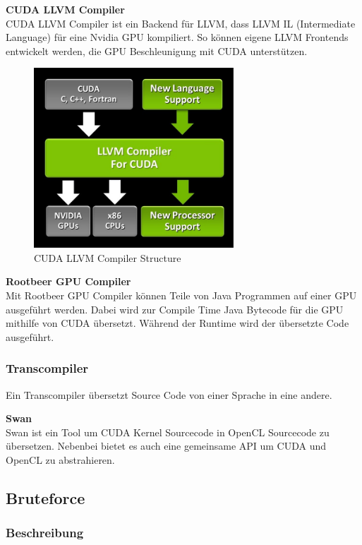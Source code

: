 \newpage

\textbf{CUDA LLVM Compiler}\\
CUDA LLVM Compiler ist ein Backend für LLVM, dass LLVM IL (Intermediate Language) für eine Nvidia GPU kompiliert. So können eigene LLVM Frontends entwickelt werden, die GPU Beschleunigung mit CUDA unterstützen.

\begin{figure}[!h]
	\begin{center}
		\includegraphics[width=7.5cm]{images/LLVM_Compiler_structure.jpg}
		\caption{CUDA LLVM Compiler Structure\cite{cudallvm}}
	\end{center}
\end{figure}

\textbf{Rootbeer GPU Compiler}\\
Mit Rootbeer GPU Compiler können Teile von Java Programmen auf einer GPU ausgeführt werden. Dabei wird zur Compile Time Java Bytecode für die GPU mithilfe von CUDA übersetzt. Während der Runtime wird der übersetzte Code ausgeführt.\cite{rootbeer1}

\subsubsection{Transcompiler}
Ein Transcompiler übersetzt Source Code von einer Sprache in eine andere.

\textbf{Swan}\\
Swan ist ein Tool um CUDA Kernel Sourcecode in OpenCL Sourcecode zu übersetzen. Nebenbei bietet es auch eine gemeinsame API um CUDA und OpenCL zu abstrahieren.\cite{swan}



\newpage
\subsection{Bruteforce}
\subsubsection{Beschreibung}

